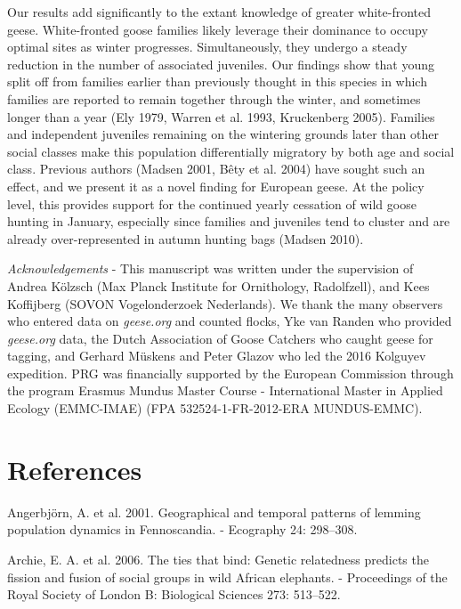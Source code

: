 \documentclass[10pt,twocolumn]{paper}
\begin{document}
Our results add significantly to the extant knowledge of greater
white-fronted geese. White-fronted goose families likely leverage their
dominance to occupy optimal sites as winter progresses. Simultaneously,
they undergo a steady reduction in the number of associated juveniles.
Our findings show that young split off from families earlier than
previously thought in this species in which families are reported to
remain together through the winter, and sometimes longer than a year
(Ely 1979, Warren et al. 1993, Kruckenberg 2005). Families and
independent juveniles remaining on the wintering grounds later than
other social classes make this population differentially migratory by
both age and social class. Previous authors (Madsen 2001, Bêty et al.
2004) have sought such an effect, and we present it as a novel finding
for European geese. At the policy level, this provides support for the
continued yearly cessation of wild goose hunting in January, especially
since families and juveniles tend to cluster and are already
over-represented in autumn hunting bags (Madsen 2010).

\emph{Acknowledgements} - This manuscript was written under the
supervision of Andrea Kölzsch (Max Planck Institute for Ornithology,
Radolfzell), and Kees Koffijberg (SOVON Vogelonderzoek Nederlands). We
thank the many observers who entered data on \emph{geese.org} and
counted flocks, Yke van Randen who provided \emph{geese.org} data, the
Dutch Association of Goose Catchers who caught geese for tagging, and
Gerhard Müskens and Peter Glazov who led the 2016 Kolguyev expedition.
PRG was financially supported by the European Commission through the
program Erasmus Mundus Master Course - International Master in Applied
Ecology (EMMC-IMAE) (FPA 532524-1-FR-2012-ERA MUNDUS-EMMC).

\section{References}\label{references}

\small

\hypertarget{refs}{}
\hypertarget{ref-angerbjorn2001geographical}{}
Angerbjörn, A. et al. 2001. Geographical and temporal patterns of
lemming population dynamics in Fennoscandia. - Ecography 24: 298--308.

\hypertarget{ref-Archie513}{}
Archie, E. A. et al. 2006. The ties that bind: Genetic relatedness
predicts the fission and fusion of social groups in wild African
elephants. - Proceedings of the Royal Society of London B: Biological
Sciences 273: 513--522.
\end{document}
